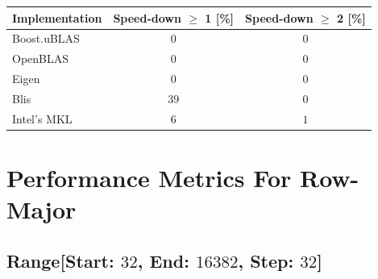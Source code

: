 \begin{table}[ht]
    \begin{tabular}{|l|c|c|}
        \hline
        \textbf{Implementation} & \textbf{Speed-down $\geq$ 1 [\%]} & \textbf{Speed-down $\geq$ 2 [\%]}\\
        \hline
        Boost.uBLAS & $0$ & $0$ \\
        \hline
        OpenBLAS    & $0$ & $0$ \\
        \hline
        Eigen       & $0$ & $0$ \\
        \hline
        Blis        & $39$ & $0$ \\
        \hline
        Intel's MKL & $6$ & $1$ \\
        \hline
    \end{tabular}
\end{table}

\clearpage
\section{Performance Metrics For Row-Major}

\subsection*{Range[Start: $32$, End: $16382$, Step: $32$]}

